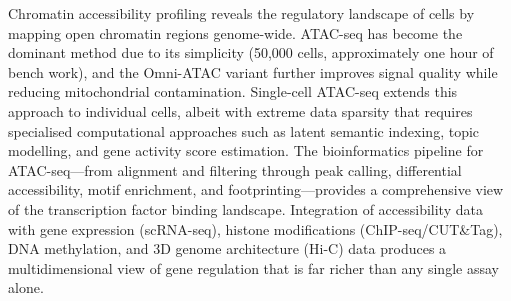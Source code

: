 Chromatin accessibility profiling reveals the regulatory landscape of cells by mapping open chromatin regions genome-wide. ATAC-seq has become the dominant method due to its simplicity (50,000 cells, approximately one hour of bench work), and the Omni-ATAC variant further improves signal quality while reducing mitochondrial contamination. Single-cell ATAC-seq extends this approach to individual cells, albeit with extreme data sparsity that requires specialised computational approaches such as latent semantic indexing, topic modelling, and gene activity score estimation. The bioinformatics pipeline for ATAC-seq---from alignment and filtering through peak calling, differential accessibility, motif enrichment, and footprinting---provides a comprehensive view of the transcription factor binding landscape. Integration of accessibility data with gene expression (\acrshort{scRNA-seq}), histone modifications (\acrshort{ChIP-seq}/CUT\&Tag), DNA methylation, and 3D genome architecture (Hi-C) data produces a multidimensional view of gene regulation that is far richer than any single assay alone.
